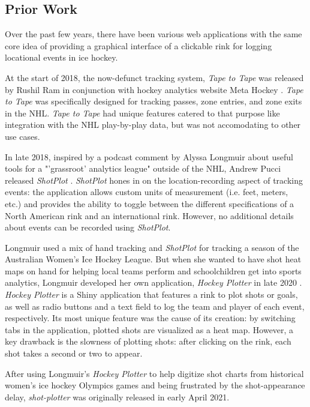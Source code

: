 \documentclass[letterpaper]{article}
\begin{document}
\subsection{Prior Work}
Over the past few years, there have been various web applications with the same core idea of providing a graphical interface of a clickable rink for logging locational events in ice hockey.

At the start of 2018, the now-defunct tracking system, \textit{Tape to Tape} was released by Rushil Ram in conjunction with hockey analytics website Meta Hockey \cite{tapetotape}. \textit{Tape to Tape} was specifically designed for tracking passes, zone entries, and zone exits in the NHL. \textit{Tape to Tape} had unique features catered to that purpose like integration with the NHL play-by-play data, but was not accomodating to other use cases.

In late 2018, inspired by a podcast comment by Alyssa Longmuir about useful tools for a "'grassroot' analytics league" outside of the NHL, Andrew Pucci released \textit{ShotPlot} \cite{alyssaAustraliaArticle}. \textit{ShotPlot} \cite{shotplot} hones in on the location-recording aspect of tracking events: the application allows custom units of measurement (i.e. feet, meters, etc.) and provides the ability to toggle between the different specifications of a North American rink and an international rink. However, no additional details about events can be recorded using \textit{ShotPlot}.

Longmuir used a mix of hand tracking and \textit{ShotPlot} for tracking a season of the Australian Women's Ice Hockey League. But when she wanted to have shot heat maps on hand for helping local teams perform and schoolchildren get into sports analytics, Longmuir developed her own application, \textit{Hockey Plotter} in late 2020 \cite{alyssaShinyArticle}. \textit{Hockey Plotter} \cite{alyssaWebsite} is a Shiny application that features a rink to plot shots or goals, as well as radio buttons and a text field to log the team and player of each event, respectively. Its most unique feature was the cause of its creation: by switching tabs in the application, plotted shots are visualized as a heat map. However, a key drawback is the slowness of plotting shots: after clicking on the rink, each shot takes a second or two to appear.

After using Longmuir's \textit{Hockey Plotter} to help digitize shot charts from historical women's ice hockey Olympics games and being frustrated by the shot-appearance delay,  \textit{shot-plotter} was originally released in early April 2021.
\end{document}
